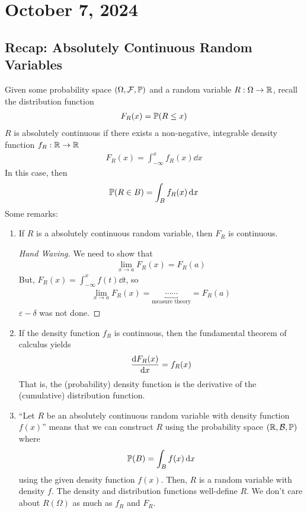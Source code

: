 \section{October 7, 2024}

\subsection{Recap: Absolutely Continuous Random Variables}
Given some probability space $(\Omega, \mathcal{F}, \mathbb{P})$ and a random variable $R: \Omega \to \mathbb{R}$, recall the distribution function
\begin{align}
    F_R(x) = \mathbb{P}(R \le x)
\end{align}
$R$ is absolutely continuous if there exists a non-negative, integrable density function $f_R: \mathbb{R} \to \mathbb{R}$
\begin{align}
    F_R(x) = \int_{-\infty}^x f_R(x) \dd{x}
\end{align}
In this case, then
\begin{align}
    \mathbb{P}(R \in B) = \int_B f_R(x) \dd{x}
\end{align}
Some remarks:
\begin{enumerate}
    \item If $R$ is a absolutely continuous random variable, then $F_R$ is continuous.
    \begin{proof}[Hand Waving]
        We need to show that
        \begin{align}
            \lim_{x\to a} F_R(x) = F_R(a)
        \end{align}
        But, $F_R(x) = \int_{-\infty}^x f(t) \dd{t}$, so
        \begin{align}
            \lim_{x\to a} F_R(x) = \underbracket{\cdots\cdots}_{\text{measure theory}} = F_R(a)
        \end{align}
        $\varepsilon-\delta$ was not done.
    \end{proof}
    \item If the density function $f_R$ is continuous, then the fundamental theorem of calculus yields
    \begin{align}
        \dv{F_R(x)}{x} = f_R(x)
    \end{align}
    That is, the (probability) density function is the derivative of the (cumulative) distribution function.
    \item ``Let $R$ be an absolutely continuous random variable with density function $f(x)$'' means that we can construct $R$ using the probability space $(\mathbb{R}, \mathcal{B}, \mathbb{P})$ where
    \begin{align}
        \mathbb{P}(B) = \int_B f(x) \dd{x}
    \end{align}
    using the given density function $f(x)$. Then, $R$ is a random variable with density $f$. The density and distribution functions well-define $R$. We don't care about $R(\Omega)$ as much as $f_R$ and $F_R$.
\end{enumerate}

